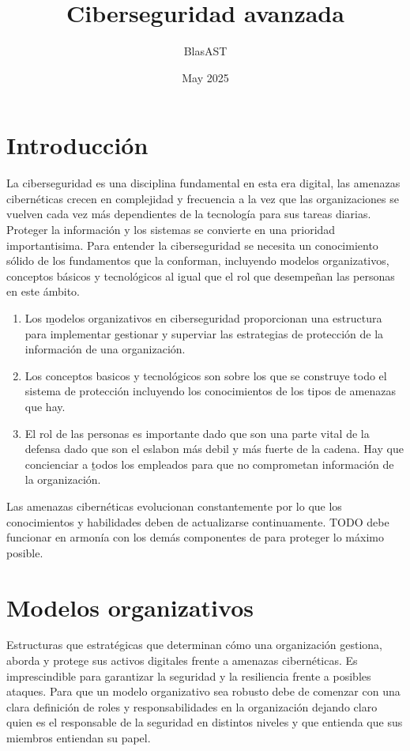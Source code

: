 \documentclass{article}
\title{
	\textbf{Ciberseguridad avanzada}
}
\author{BlasAST}
\date{May 2025}
\begin{document}
\maketitle

\newpage

\tableofcontents

\newpage
\section{Introducción}

La ciberseguridad es una disciplina fundamental en esta era digital, las
amenazas cibernéticas crecen en complejidad y frecuencia a la vez que las
organizaciones se vuelven cada vez más dependientes de la tecnología para
sus tareas diarias. Proteger la información y los sistemas se convierte
en una prioridad importantisima. Para entender la ciberseguridad se necesita
un conocimiento sólido de los fundamentos que la conforman, incluyendo
modelos organizativos, conceptos básicos y tecnológicos al igual que el rol
que desempeñan las personas en este ámbito.

\begin{enumerate}
	\item Los \b{modelos organizativos en ciberseguridad} proporcionan una
		estructura para implementar gestionar y superviar las estrategias de
		protección de la información de una organización.
	\item Los conceptos basicos y tecnológicos son sobre los que se construye
		todo el sistema de protección incluyendo los conocimientos de los tipos
		de amenazas que hay.
	\item El rol de las personas es importante dado que son una parte vital de
		la defensa dado que son el eslabon más debil y más fuerte de la cadena.
		Hay que concienciar a \b{todos} los empleados para que no comprometan
		información de la organización.
\end{enumerate}

Las amenazas cibernéticas evolucionan constantemente por lo que los conocimientos
y habilidades deben de actualizarse continuamente. TODO debe funcionar en armonía
con los demás componentes de para proteger lo máximo posible.

\section{Modelos organizativos}

Estructuras que estratégicas que determinan cómo una organización gestiona, aborda
y protege sus activos digitales frente a amenazas cibernéticas. Es imprescindible
para garantizar la seguridad y la resiliencia frente a posibles ataques.
Para que un modelo organizativo sea robusto debe de comenzar con una clara
definición de roles y responsabilidades en la organización dejando claro quien
es el responsable de la seguridad en distintos niveles y que entienda que
sus miembros entiendan su papel.
\end{document}
